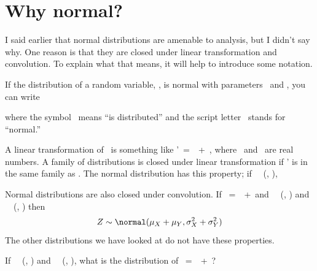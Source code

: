 \documentclass[12pt]{book}
\begin{document}
\section{Why normal?}
\label{why_normal}

I said earlier that normal distributions are amenable to analysis,
but I didn't say why.  One reason is that they are
closed under linear transformation and convolution.  To explain what
that means, it will help to introduce some notation.

If the distribution of a random variable, \X, is
normal with parameters \mymu~and \mysigma, you can write


where the symbol \mysim~means ``is distributed'' and the script letter
\mynormal~stands for ``normal.''


A linear transformation of \X~is something like \X'~=~\mya \X~+~\myb, where
\mya~and \myb~are real numbers.
A family of distributions is closed under
linear transformation if \X' is in the same family as \X.  The normal
distribution has this property; if \X~\mysim~\mynormal (\mymu,
\sigmasq),


Normal distributions are also closed under convolution.  
If \Z~=~\X~+~\Y and
\X~\mysim~\mynormal (\mymu{}, \mysigma{}) and
\Y~\mysim~\mynormal (\mymu{}, \mysigma{}) then
%
\[ Z \sim \normal (\mu_X + \mu_Y, \sigma_X^2 + \sigma_Y^2) \]
%
The other distributions we have looked at do not have these
properties.

\begin{exercise}
If 
\X~\mysim~\mynormal (\mymu{}, \mysigma{}) and
\Y~\mysim~\mynormal (\mymu{}, \mysigma{}), what 
is the distribution of \Z~=~\mya\X~+~\myb\Y?

\end{exercise}
\end{document}
